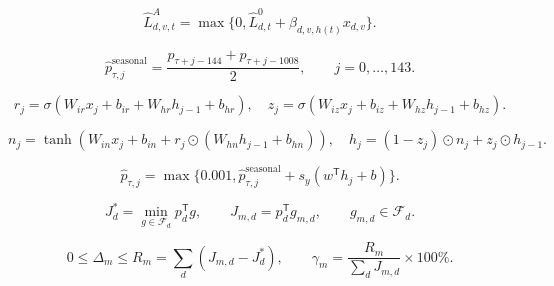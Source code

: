 \[
\hat L^{A}_{d,v,t}=\max\{0,\hat L^{0}_{d,t}+\hat\beta_{d,v,h(t)}x_{d,v}\}.
\]

\[
\hat p^{\mathrm{seasonal}}_{\tau,j}=\frac{p_{\tau+j-144}+p_{\tau+j-1008}}2,\qquad j=0,\ldots,143.
\]

\[
r_j=\sigma(W_{ir}x_j+b_{ir}+W_{hr}h_{j-1}+b_{hr}),\quad z_j=\sigma(W_{iz}x_j+b_{iz}+W_{hz}h_{j-1}+b_{hz}).
\]

\[
n_j=\tanh(W_{in}x_j+b_{in}+r_j\odot(W_{hn}h_{j-1}+b_{hn})),\quad h_j=(1-z_j)\odot n_j+z_j\odot h_{j-1}.
\]

\[
\hat p_{\tau,j}=\max\{0.001,\hat p^{\mathrm{seasonal}}_{\tau,j}+s_y(w^\mathsf{T}h_j+b)\}.
\]

\[
J_d^*=\min_{g\in\mathcal F_d}p_d^\mathsf{T}g,\qquad J_{m,d}=p_d^\mathsf{T}g_{m,d},\qquad g_{m,d}\in\mathcal F_d.
\]

\[
0\le\Delta_m\le R_m=\sum_d(J_{m,d}-J_d^*),\qquad \gamma_m=\frac{R_m}{\sum_dJ_{m,d}}\times100\%.
\]